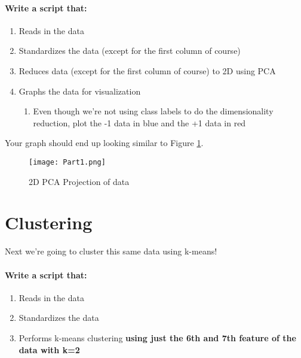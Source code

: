 \documentclass[12pt]{article}
\begin{document}
\paragraph{Write a script that:}
\begin{enumerate}
  \item Reads in the data
  \item Standardizes the data (except for the first column of course)
  \item Reduces data (except for the first column of course) to 2D using PCA
  \item Graphs the data for visualization
      \begin{enumerate}
        \item   Even though we're not using class labels to do the dimensionality reduction, plot the -1 data in blue and the +1 data in red
      \end{enumerate}
\end{enumerate}


Your graph should end up looking similar to Figure \ref{PCA}.
\begin{figure}[H]
\begin{center}
\texttt{[image: Part1.png]}
\caption{2D PCA Projection of data}
\label{PCA}
\end{center}
\end{figure}


\newpage
\section{Clustering}
Next we're going to cluster this same data using k-means!\\


\paragraph{Write a script that:}
\begin{enumerate}
\item Reads in the data
\item Standardizes the data
\item Performs k-means clustering \textbf{using just the 6th and 7th feature of the data with k=2}
\end{enumerate}
\end{document}
